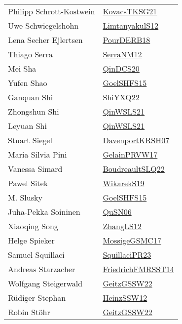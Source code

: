 {\begin{longtable}{p{4cm}p{20cm}}
Philipp Schrott{-}Kostwein & \href{papers/KovacsTKSG21.pdf}{KovacsTKSG21}\cite{KovacsTKSG21} \\
Uwe Schwiegelshohn & \href{articles/LimtanyakulS12.pdf}{LimtanyakulS12}\cite{LimtanyakulS12} \\
Lena Secher Ejlertsen & \href{articles/PourDERB18.pdf}{PourDERB18}\cite{PourDERB18} \\
Thiago Serra & \href{papers/SerraNM12.pdf}{SerraNM12}\cite{SerraNM12} \\
Mei Sha & \href{articles/QinDCS20.pdf}{QinDCS20}\cite{QinDCS20} \\
Yufen Shao & \href{articles/GoelSHFS15.pdf}{GoelSHFS15}\cite{GoelSHFS15} \\
Ganquan Shi & \href{}{ShiYXQ22}\cite{ShiYXQ22} \\
Zhongshun Shi & \href{articles/QinWSLS21.pdf}{QinWSLS21}\cite{QinWSLS21} \\
Leyuan Shi & \href{articles/QinWSLS21.pdf}{QinWSLS21}\cite{QinWSLS21} \\
Stuart Siegel & \href{papers/DavenportKRSH07.pdf}{DavenportKRSH07}\cite{DavenportKRSH07} \\
Maria Silvia Pini & \href{papers/GelainPRVW17.pdf}{GelainPRVW17}\cite{GelainPRVW17} \\
Vanessa Simard & \href{papers/BoudreaultSLQ22.pdf}{BoudreaultSLQ22}\cite{BoudreaultSLQ22} \\
Pawel Sitek & \href{articles/WikarekS19.pdf}{WikarekS19}\cite{WikarekS19} \\
M. Slusky & \href{articles/GoelSHFS15.pdf}{GoelSHFS15}\cite{GoelSHFS15} \\
Juha{-}Pekka Soininen & \href{papers/QuSN06.pdf}{QuSN06}\cite{QuSN06} \\
Xiaoqing Song & \href{papers/ZhangLS12.pdf}{ZhangLS12}\cite{ZhangLS12} \\
Helge Spieker & \href{papers/MossigeGSMC17.pdf}{MossigeGSMC17}\cite{MossigeGSMC17} \\
Samuel Squillaci & \href{papers/SquillaciPR23.pdf}{SquillaciPR23}\cite{SquillaciPR23} \\
Andreas Starzacher & \href{}{FriedrichFMRSST14}\cite{FriedrichFMRSST14} \\
Wolfgang Steigerwald & \href{papers/GeitzGSSW22.pdf}{GeitzGSSW22}\cite{GeitzGSSW22} \\
R{\"{u}}diger Stephan & \href{articles/HeinzSSW12.pdf}{HeinzSSW12}\cite{HeinzSSW12} \\
Robin St{\"{o}}hr & \href{papers/GeitzGSSW22.pdf}{GeitzGSSW22}\cite{GeitzGSSW22} \\

\end{longtable}}
